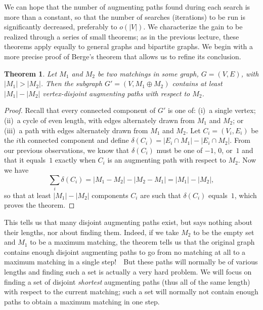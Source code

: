\documentclass[11pt]{article}
\newtheorem{theorem}{Theorem}
\begin{document}
We can hope that the number of augmenting paths found during each search
is more than a constant, so that the number of searches (iterations)
to be run is significantly decreased, preferably to $o(|V|)$.
We characterize the gain to be realized through a series of small
theorems; as in the previous lecture, these theorems apply equally to
general graphs and bipartite graphs.  We begin with a more precise proof
of Berge's theorem that allows us to refine its conclusion.
\begin{theorem}
  Let $M_1$ and $M_2$ be two matchings in some graph, $G=(V,E)$, with
  $|M_1| > |M_2|$.  Then the subgraph $G'=(V,M_1 \oplus M_2)$ contains at least 
  $|M_1| - |M_2|$ vertex-disjoint augmenting paths with respect to $M_2$.
\end{theorem}
\begin{proof}
  Recall that every connected component of $G'$ is one of: (i)~a single vertex;
  (ii)~a cycle of even length, with edges alternately drawn from $M_1$ and
  $M_2$; or (iii)~a path with edges alternately drawn from $M_1$ and $M_2$.
  Let $C_i=(V_i,E_i)$ be the $i$th connected component and define
  $\delta(C_i) = |E_i \cap M_1| - |E_i \cap M_2|$.  From our previous
  observations, we know that $\delta(C_i)$ must be one of $-1$, $0$, or~$1$
  and that it equals~$1$ exactly when $C_i$ is an augmenting path with
  respect to $M_2$.  Now we have
  \begin{displaymath}
    \sum_i \delta(C_i) = |M_1 - M_2| - |M_2 - M_1| = |M_1| - |M_2|,
  \end{displaymath}
  so that at least $|M_1|-|M_2|$ components $C_i$ are such that $\delta(C_i)$
  equals~$1$, which proves the theorem.
\end{proof}
This tells us that many disjoint augmenting paths exist, but says nothing
about their lengths, nor about finding them.  Indeed, if we take $M_2$
to be the empty set and $M_1$ to be a maximum matching, the theorem tells
us that the original graph contains enough disjoint augmenting paths to
go from no matching at all to a maximum matching in a single step!\ \ But
these paths will normally be of various lengths and finding such a set is
actually a very hard problem.  We will focus on finding a set of disjoint
\emph{shortest} augmenting paths (thus all of the same length) with respect
to the current matching; such a set will normally not contain enough paths
to obtain a maximum matching in one step.
\end{document}
